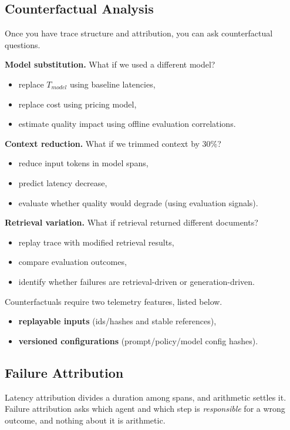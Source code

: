 \subsection{Counterfactual Analysis}

Once you have trace structure and attribution, you can ask counterfactual questions.

\textbf{Model substitution.} What if we used a different model?
\begin{itemize}
\item replace $T_{model}$ using baseline latencies,
\item replace cost using pricing model,
\item estimate quality impact using offline evaluation correlations.
\end{itemize}

\textbf{Context reduction.} What if we trimmed context by 30\%?
\begin{itemize}
\item reduce input tokens in model spans,
\item predict latency decrease,
\item evaluate whether quality would degrade (using evaluation signals).
\end{itemize}

\textbf{Retrieval variation.} What if retrieval returned different documents?
\begin{itemize}
\item replay trace with modified retrieval results,
\item compare evaluation outcomes,
\item identify whether failures are retrieval-driven or generation-driven.
\end{itemize}

Counterfactuals require two telemetry features, listed below.
\begin{itemize}
\item \textbf{replayable inputs} (ids/hashes and stable references),
\item \textbf{versioned configurations} (prompt/policy/model config hashes).
\end{itemize}

\subsection{Failure Attribution}

Latency attribution divides a duration among spans, and arithmetic settles it.
Failure attribution asks which agent and which step is \emph{responsible} for a
wrong outcome, and nothing about it is arithmetic.

